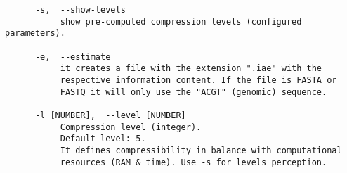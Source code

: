 \begin{lstlisting}
      -s,  --show-levels                                                
           show pre-computed compression levels (configured parameters).
                                                                        
      -e,  --estimate                                                   
           it creates a file with the extension ".iae" with the       
           respective information content. If the file is FASTA or      
           FASTQ it will only use the "ACGT" (genomic) sequence.      
                                                                        
      -l [NUMBER],  --level [NUMBER]                                    
           Compression level (integer).                                 
           Default level: 5.                                           
           It defines compressibility in balance with computational     
           resources (RAM & time). Use -s for levels perception.        
                                                                        

\end{lstlisting}
